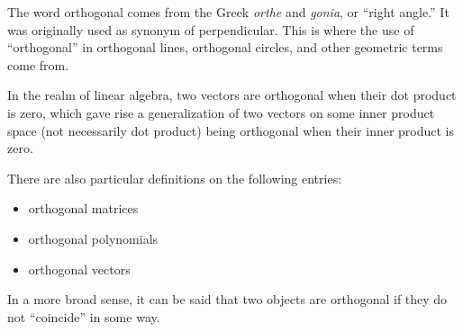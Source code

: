 \documentclass{article}
\begin{document}
The word orthogonal comes from the Greek \emph{orthe} and \emph{gonia}, or ``right angle.''  It was originally used as synonym of perpendicular. This is where the use of ``orthogonal'' in  orthogonal lines, orthogonal circles, and other geometric terms come from.

In the realm of linear algebra, two vectors are orthogonal when their dot product is zero, which gave rise a generalization of two vectors on some inner product space (not necessarily dot product) being orthogonal when their inner product is zero. 

There are also particular definitions on the following entries:
\begin{itemize}
 \item orthogonal matrices
 \item orthogonal polynomials
 \item orthogonal vectors
\end{itemize}

In a more broad sense, it can be said that two objects are orthogonal if they do not ``coincide'' in some way.
\end{document}

